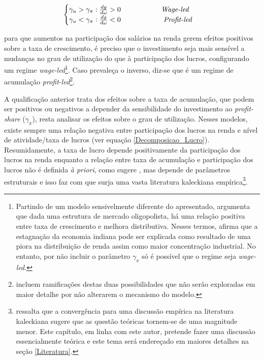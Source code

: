 \begin{center}
$$
\begin{cases}
\gamma_u > \gamma_{\pi}:\frac{dg}{d\omega} > 0\hspace{2cm} \text{\textit{Wage-led}}\\
\gamma_u < \gamma_{\pi}:\frac{dg}{d\omega} < 0 \hspace{2cm} \text{          \textit{Profit-led}}
\end{cases}
$$
\end{center}
para que aumentos na participação dos salários na renda gerem efeitos positivos sobre a taxa de crescimento, é preciso que o investimento seja mais sensível a mudanças no grau de utilização do que à participação dos lucros, configurando um regime \textit{wage-led}\footnote{
Partindo de um modelo sensivelmente diferente do apresentado, \textcite{dutt_stagnation_1984} argumenta que dada uma estrutura de mercado oligopolista, há uma relação positiva entre taxa de crescimento e melhora distributiva. Nesses termos, afirma que a estagnação da economia indiana pode ser explicada como resultado de uma piora na distribuição de renda assim como maior concentração industrial. No entanto, por não incluir o parâmetro $\gamma_\pi$ só é possível que o regime seja \textit{wage-led}.}.  Caso prevaleça o inverso, diz-se que é um regime de acumulação \textit{profit-led}\footnote{\textcite{bhaduri_unemployment_1990} incluem ramificações destas duas possibilidades que não serão exploradas em maior detalhe por não alterarem o mecanismo do modelo.}.

A qualificação anterior trata dos efeitos sobre a taxa de acumulação, que podem ser positivos ou negativos a depender da sensibilidade do investimento ao \textit{profit-share} ($\gamma_{\pi}$), resta analisar os efeitos sobre o grau de utilização. Nesses modelos, existe sempre uma relação negativa entre participação dos lucros na renda e nível de atividade/taxa de lucros (ver equação \ref{Decomposicao_Lucro}). Resumidamente, a taxa de lucro depende positivamente da participação dos lucros na renda enquanto a relação entre taxa de acumulação e participação dos lucros não é definida \textit{à priori}, como sugere \textcite{bhaduri_unemployment_1990}, mas depende de parâmetros estruturais e isso faz com que surja uma vasta literatura kaleckiana empírica\footnote{\textcite{pariboni_autonomous_2015} ressalta que a convergência para uma discussão empírica na literatura kaleckiana sugere que as questão teóricas tornem-se de uma magnitude menor. Este capítulo, em linha com este autor, pretende fazer uma discussão essencialmente teórica e este tema será endereçado em maiores detalhes na seção \ref{Literatura}.}.

